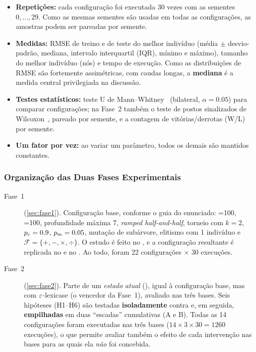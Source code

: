\begin{itemize}
  \item \textbf{Repetições:} cada configuração foi executada 30 vezes com as
        sementes $0,\dots,29$. Como as mesmas sementes são usadas em todas as
        configurações, as amostras podem ser pareadas por semente.
  \item \textbf{Medidas:} RMSE de treino e de teste do melhor indivíduo
        (média $\pm$ desvio-padrão, mediana, intervalo interquartil (IQR),
        mínimo e máximo), tamanho do melhor indivíduo (nós) e tempo de
        execução. Como as distribuições de RMSE são fortemente assimétricas,
        com caudas longas, a \textbf{mediana} é a medida central privilegiada
        na discussão.
  \item \textbf{Testes estatísticos:} teste U de
        Mann--Whitney~\cite{mann1947test} (bilateral, $\alpha=0.05$) para
        comparar configurações; na Fase~2 também o teste de postos sinalizados
        de Wilcoxon~\cite{wilcoxon1945individual}, pareado por semente, e a
        contagem de vitórias/derrotas (W/L) por semente.
  \item \textbf{Um fator por vez:} ao variar um parâmetro, todos os demais
        são mantidos constantes.
\end{itemize}

\subsubsection{Organização das Duas Fases Experimentais}

\begin{description}
  \item[Fase~1] (\cref{sec:fase1}). Configuração base, conforme o guia do
        enunciado: =100, =100, profundidade máxima 7,
        \emph{ramped half-and-half}, torneio com $k=2$, $p_c=0.9$,
        $p_m=0.05$, mutação de subárvore, elitismo com 1 indivíduo e
        $\mathcal{F}=\{+,-,\times,\div\}$. O estudo é feito no ,
        e a configuração resultante é replicada no  e no
        . Ao todo, foram 22 configurações $\times$ 30
        execuções.
  \item[Fase~2] (\cref{sec:fase2}). Parte de um \emph{estado atual}
        (), igual à configuração base, mas com $\varepsilon$-lexicase (o
        vencedor da Fase~1), avaliado nas três bases. Seis hipóteses (H1--H6)
        são testadas \textbf{isoladamente} contra  e, em seguida,
        \textbf{empilhadas} em duas ``escadas'' cumulativas (A e B). Todas
        as 14 configurações foram executadas nas três bases
        ($14\times3\times30 = 1260$ execuções), o que permite avaliar também
        o efeito de cada intervenção nas bases para as quais ela
        \emph{não} foi concebida.
\end{description}
